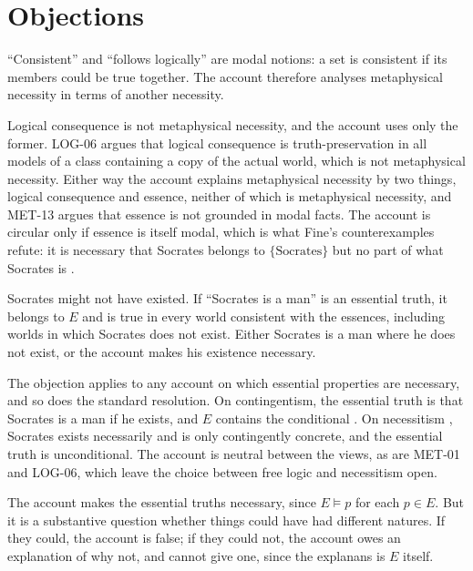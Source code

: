 \documentclass{situationist-preprint}
\begin{document}
\section{Objections}

\begin{objection}[Circularity]
\enquote{Consistent} and \enquote{follows logically} are modal notions: a set is consistent if its members could be true together. The account therefore analyses metaphysical necessity in terms of another necessity.
\end{objection}

\begin{reply}
Logical consequence is not metaphysical necessity, and the account uses only the former. LOG-06 argues that logical consequence is truth-preservation in all models of a class containing a copy of the actual world, which is not metaphysical necessity. Either way the account explains metaphysical necessity by two things, logical consequence and essence, neither of which is metaphysical necessity, and MET-13 argues that essence is not grounded in modal facts. The account is circular only if essence is itself modal, which is what Fine's counterexamples refute: it is necessary that Socrates belongs to $\{\text{Socrates}\}$ but no part of what Socrates is \citep{Fine1994}.
\end{reply}

\begin{objection}
Socrates might not have existed. If \enquote{Socrates is a man} is an essential truth, it belongs to $E$ and is true in every world consistent with the essences, including worlds in which Socrates does not exist. Either Socrates is a man where he does not exist, or the account makes his existence necessary.
\end{objection}

\begin{reply}
The objection applies to any account on which essential properties are necessary, and so does the standard resolution. On contingentism, the essential truth is that Socrates is a man if he exists, and $E$ contains the conditional \citep{Fine1994}. On necessitism \citep{Williamson2013}, Socrates exists necessarily and is only contingently concrete, and the essential truth is unconditional. The account is neutral between the views, as are MET-01 and LOG-06, which leave the choice between free logic and necessitism open.
\end{reply}

\begin{objection}
The account makes the essential truths necessary, since $E\vDash p$ for each $p\in E$. But it is a substantive question whether things could have had different natures. If they could, the account is false; if they could not, the account owes an explanation of why not, and cannot give one, since the explanans is $E$ itself.
\end{objection}
\end{document}
